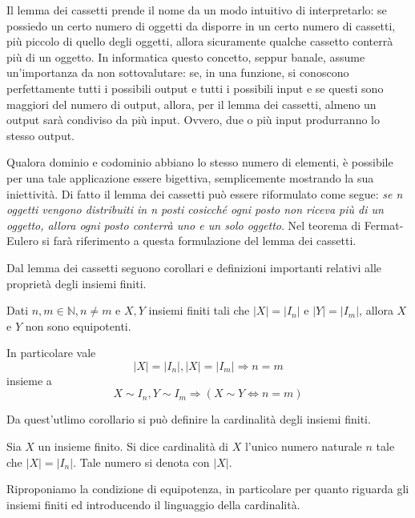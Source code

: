 \documentclass[oneside]{book}
\begin{document}
Il lemma dei cassetti prende il nome da un modo intuitivo di interpretarlo:
se possiedo un certo numero di oggetti da disporre in un certo numero di
cassetti, più piccolo di quello degli oggetti, allora sicuramente qualche
cassetto conterrà più di un oggetto.
In informatica questo concetto, seppur banale, assume un'importanza da non
sottovalutare: se, in una funzione, si conoscono perfettamente tutti i possibili output e
tutti i possibili input e se questi sono maggiori del numero di output,
allora, per il lemma dei cassetti, almeno un output sarà condiviso da più
input. Ovvero, due o più input produrranno lo stesso output.

\begin{osservaz}
Qualora dominio e codominio abbiano lo stesso numero di elementi,
è possibile per una tale applicazione essere bigettiva, semplicemente
mostrando la sua iniettività. Di fatto il lemma dei cassetti può essere
riformulato come segue: \emph{se n oggetti vengono distribuiti in n posti
cosicché ogni posto non riceva più di un oggetto, allora ogni posto
conterrà uno e un solo oggetto}. Nel teorema di Fermat-Eulero
si farà riferimento a questa formulazione del
lemma dei cassetti.
\end{osservaz}

Dal lemma dei cassetti seguono corollari e definizioni importanti
relativi alle proprietà degli insiemi finiti.
\begin{tcolorbox}[colback=green!30, colframe=green!30!black, title={Equipotenza tra insiemi finiti}]
Dati $n,m\in\mathbb{N}, n\not=m$ e $X,Y$ insiemi finiti tali che $|X|=|I_n|$ e $|Y|=|I_m|$,
allora $X$ e $Y$ non sono equipotenti.

In particolare vale \[ |X|=|I_n|,|X|=|I_m| \Longrightarrow n=m \]
insieme a \[ X\sim I_n,Y\sim I_m \Longrightarrow (X\sim Y \Leftrightarrow n = m) \]
\end{tcolorbox}
Da quest'utlimo corollario si può definire la cardinalità degli insiemi
finiti.

\begin{tcolorbox}[colback=yellow!30, colframe=yellow!30!black, title={Cardinalità di un insieme finito}]
Sia $X$ un insieme finito. Si dice cardinalità di $X$ l'unico numero
naturale $n$ tale che $|X|=|I_n|$. Tale numero si denota con $|X|$.
\end{tcolorbox}

Riproponiamo la condizione di equipotenza, in particolare per quanto
riguarda gli insiemi finiti ed introducendo il linguaggio della cardinalità.
\end{document}
